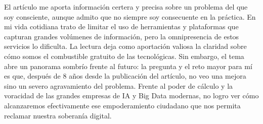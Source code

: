 El artículo me aporta información certera y precisa sobre un problema del que soy consciente, aunque admito que no siempre soy consecuente en la práctica.
En mi vida cotidiana trato de limitar el uso de herramientas y plataformas que capturan grandes volúmenes de información, pero la omnipresencia de estos servicios lo dificulta.
La lectura deja como aportación valiosa la claridad sobre cómo somos el combustible gratuito de las tecnológicas.
Sin embargo, el tema abre un panorama sombrío frente al futuro: la pregunta y el reto mayor para mí es que, después de 8 años desde la publicación del artículo, no veo una mejora sino un severo agravamiento del problema.
Frente al poder de cálculo y la voracidad de las grandes empresas de IA y Big Data modernas, no logro ver cómo alcanzaremos efectivamente ese empoderamiento ciudadano que nos permita reclamar nuestra soberanía digital.
